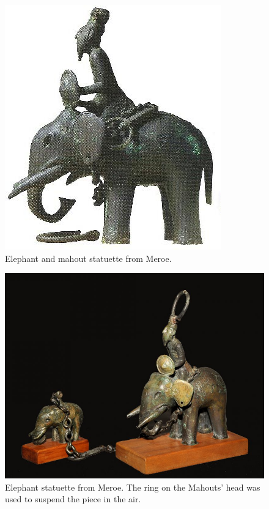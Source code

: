 \documentclass[a4paper,12pt]{scrreprt}
\begin{document}
\begin{figure}[H]
	\centering
	\includegraphics[width=\textwidth]{img/mahout_elephant}
	\caption{Elephant and mahout statuette from Meroe.}
\end{figure}

\begin{figure}[H]
	\centering
	\includegraphics[width=\textwidth]{img/mahout_two_elephants}
	\caption{Elephant statuette from Meroe. The ring on the Mahouts' head was used to suspend the piece in the air.}
\end{figure}
\end{document}
